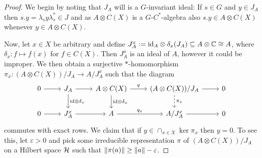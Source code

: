 \begin{proof}
	We begin by noting that $J_A$ will is a $G$-invariant ideal: If $s \in G$ and $y \in J_A$ then $s.y = \lambda_s y \lambda_s^*  \in J$ and as $A \otimes C(X)$ is a $G$-$C^*$-algebra also $s.y \in A \otimes C(X)$ whenever $y \in A \otimes C(X)$.
	
	Now, let $x \in X$ be arbitrary and define $J_A^x := \mathrm{id}_A \otimes \delta_x(J_A) \subseteq A \otimes \mathbb{C} \cong A$, where $\delta_x \colon f \mapsto f(x)$ for $f \in C(X)$. Then $J_A^x$ is an ideal of $A$, however it could be improper. We then obtain a surjective $*$-homomorphism $\pi_x \colon (A \otimes C(X)) / J_A \to A / J_A^x$ such that the diagram
	\begin{equation*}
		\begin{tikzcd}
			0 \ar[r] & J_A \ar[r] \ar[d, "\mathrm{id}\otimes \delta_x"] & A \otimes C(X) \ar[d, "\mathrm{id}\otimes \delta_x"] \ar[r,"q"] &(A \otimes C(X)) /J_A \ar[r] \ar[d,dashed, "\pi_x"] & 0\\
			0 \ar[r] & J_A^x \ar[r] & A \ar[r, "q_x"] & A/J_A^x \ar[r] & 0
		\end{tikzcd}
	\end{equation*}
	commutes with exact rows. We claim that if $y \in \cap_{x \in X} \ker \pi_x$ then $y = 0$. To see this, let $\varepsilon > 0$ and pick some irreducible representation $\pi$ of $(A \otimes C(X))/J_A$ on a Hilbert space $\mathcal{H}$ such that $\left\lVert \pi(a) \right\rVert \geq \left\lVert a \right\rVert - \varepsilon$.
	

\end{proof}
